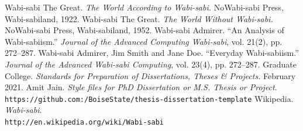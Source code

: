 \documentclass[dissertation]{bsu-cs}  %
\begin{document}
%
%





%
%



\begin{thebibliography}{99}
\label{references}
 Wabi-sabi The Great. \emph{The World According to Wabi-sabi.} NoWabi-sabi
Press, Wabi-sabiland, 1922.
 Wabi-sabi The Great. \emph{The World Without Wabi-sabi.} NoWabi-sabi
Press, Wabi-sabiland, 1952.
 Wabi-sabi Admirer. ``An Analysis of Wabi-sabiism.'' \emph{Journal of the
Advanced Computing Wabi-sabi}, vol. 21(2), pp. 272--287.
 Wabi-sabi Admirer, Jim Smith and Jane Doe. ``Everyday
Wabi-sabiism.'' \emph{Journal of the Advanced Wabi-sabi Computing}, vol. 23(4), pp. 272--287.
 Graduate College. \emph{Standards for Preparation of Dissertations, Theses \&
Projects.} February 2021.
 Amit Jain. \emph{Style files for PhD Dissertation or M.S. Thesis or Project}.\\
\texttt{https://github.com:/BoiseState/thesis-dissertation-template}
 Wikipedia. \emph{Wabi-sabi}.\\
\texttt{http://en.wikipedia.org/wiki/Wabi-sabi}
\end{thebibliography}


%
%
\end{document}
